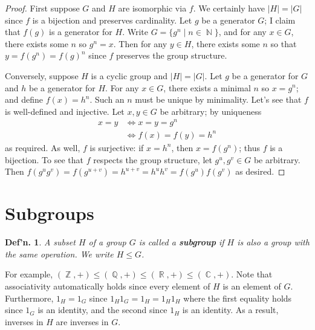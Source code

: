\documentclass[12pt, a4paper]{book}
\DeclareMathOperator{\N}{\mathbb{N}}
\DeclareMathOperator{\Q}{\mathbb{Q}}
\DeclareMathOperator{\Z}{\mathbb{Z}}
\DeclareMathOperator{\R}{\mathbb{R}}
\DeclareMathOperator{\C}{\mathbb{C}}
\newtheorem{definition}[theorem]{Def'n.}
\theoremstyle{nonumberplain}
\newtheorem{proof}{Proof}
\begin{document}
\begin{proof}
    First suppose $G$ and $H$ are isomorphic via $f$.
    We certainly have $|H|=|G|$ since $f$ is a bijection and preserves cardinality.
    Let $g$ be a generator $G$; I claim that $f(g)$ is a generator for $H$.
    Write $G=\{g^n\mid n\in\N\}$, and for any $x\in G$, there exists some $n$ so $g^n=x$.
    Then for any $y\in H$, there exists some $n$ so that $y=f(g^n)=f(g)^n$ since $f$ preserves the group structure.

    Conversely, suppose $H$ is a cyclic group and $|H|=|G|$.
    Let $g$ be a generator for $G$ and $h$ be a generator for $H$.
    For any $x\in G$, there exists a minimal $n$ so $x=g^n$; and define $f(x)=h^n$.
    Such an $n$ must be unique by minimality.
    Let's see that $f$ is well-defined and injective.
    Let $x,y\in G$ be arbitrary; by uniqueness
    \begin{align*}
        x=y &\Leftrightarrow x=y=g^n\\
            &\Leftrightarrow f(x)=f(y)=h^n
    \end{align*}
    as required.
    As well, $f$ is surjective: if $x=h^n$, then $x=f(g^n)$; thus $f$ is a bijection.
    To see that $f$ respects the group structure, let $g^u,g^v\in G$ be arbitrary.
    Then $f(g^ug^v)=f(g^{u+v})=h^{u+v}=h^uh^v=f(g^u)f(g^v)$ as desired.
\end{proof}
\section{Subgroups}
\begin{definition}
    A subset $H$ of a group $G$ is called a \textbf{subgroup} if $H$ is also a group with the same operation.
    We write $H\leq G$.
\end{definition}
For example, $(\Z,+)\leq(\Q,+)\leq(\R,+)\leq(\C,+)$.
Note that associativity automatically holds since every element of $H$ is an element of $G$.
Furthermore, $1_H=1_G$ since $1_H1_G=1_H=1_H1_H$ where the first equality holds since $1_G$ is an identity, and the second since $1_H$ is an identity.
As a result, inverses in $H$ are inverses in $G$.
\end{document}
